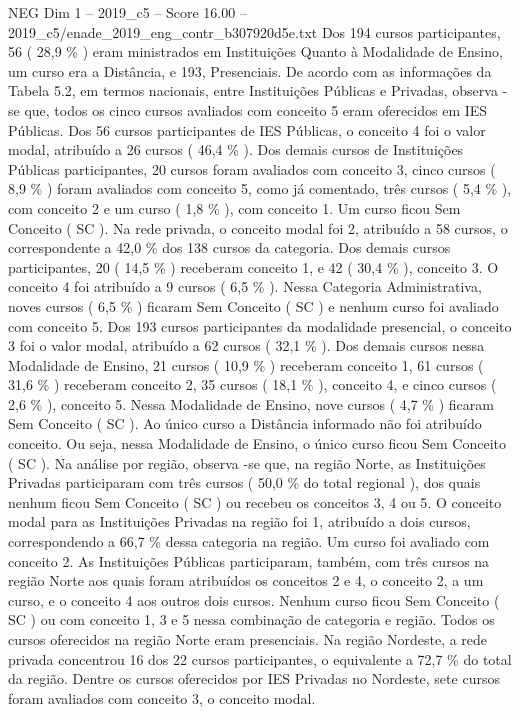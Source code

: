 \begin{textsample}{NEG Dim 1 – 2019\_c5 – Score 16.00 – 2019\_c5/enade\_2019\_eng\_contr\_b307920d5e.txt}
Dos 194 cursos participantes, 56 ( 28,9 \% ) eram ministrados em Instituições Quanto à Modalidade de Ensino, um curso era a Distância, e 193, Presenciais.
De acordo com as informações da Tabela 5.2, em termos nacionais, entre Instituições Públicas e Privadas, observa -se que, todos os cinco cursos avaliados com conceito 5 eram oferecidos em IES Públicas.
Dos 56 cursos participantes de IES Públicas, o conceito 4 foi o valor modal, atribuído a 26 cursos ( 46,4 \% ).
Dos demais cursos de Instituições Públicas participantes, 20 cursos foram avaliados com conceito 3, cinco cursos ( 8,9 \% ) foram avaliados com conceito 5, como já comentado, três cursos ( 5,4 \% ), com conceito 2 e um curso ( 1,8 \% ), com conceito 1.
Um curso ficou Sem Conceito ( SC ).
Na rede privada, o conceito modal foi 2, atribuído a 58 cursos, o correspondente a 42,0 \% dos 138 cursos da categoria.
Dos demais cursos participantes, 20 ( 14,5 \% ) receberam conceito 1, e 42 ( 30,4 \% ), conceito 3.
O conceito 4 foi atribuído a 9 cursos ( 6,5 \% ).
Nessa Categoria Administrativa, noves cursos ( 6,5 \% ) ficaram Sem Conceito ( SC ) e nenhum curso foi avaliado com conceito 5.
Dos 193 cursos participantes da modalidade presencial, o conceito 3 foi o valor modal, atribuído a 62 cursos ( 32,1 \% ).
Dos demais cursos nessa Modalidade de Ensino, 21 cursos ( 10,9 \% ) receberam conceito 1, 61 cursos ( 31,6 \% ) receberam conceito 2, 35 cursos ( 18,1 \% ), conceito 4, e cinco cursos ( 2,6 \% ), conceito 5.
Nessa Modalidade de Ensino, nove cursos ( 4,7 \% ) ficaram Sem Conceito ( SC ).
Ao único curso a Distância informado não foi atribuído conceito.
Ou seja, nessa Modalidade de Ensino, o único curso ficou Sem Conceito ( SC ).
Na análise por região, observa -se que, na região Norte, as Instituições Privadas participaram com três cursos ( 50,0 \% do total regional ), dos quais nenhum ficou Sem Conceito ( SC ) ou recebeu os conceitos 3, 4 ou 5.
O conceito modal para as Instituições Privadas na região foi 1, atribuído a dois cursos, correspondendo a 66,7 \% dessa categoria na região.
Um curso foi avaliado com conceito 2.
As Instituições Públicas participaram, também, com três cursos na região Norte aos quais foram atribuídos os conceitos 2 e 4, o conceito 2, a um curso, e o conceito 4 aos outros dois cursos.
Nenhum curso ficou Sem Conceito ( SC ) ou com conceito 1, 3 e 5 nessa combinação de categoria e região.
Todos os cursos oferecidos na região Norte eram presenciais.
Na região Nordeste, a rede privada concentrou 16 dos 22 cursos participantes, o equivalente a 72,7 \% do total da região.
Dentre os cursos oferecidos por IES Privadas no Nordeste, sete cursos foram avaliados com conceito 3, o conceito modal.

\end{textsample}

